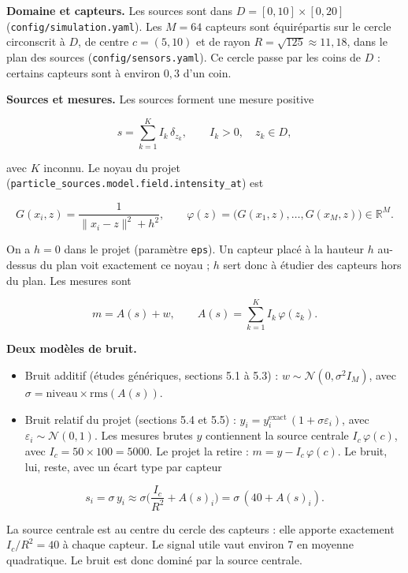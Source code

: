 \documentclass[
  french,
]{article}
\providecommand{\tightlist}{%
  \setlength{\itemsep}{0pt}\setlength{\parskip}{0pt}}
\begin{document}
\textbf{Domaine et capteurs.} Les sources sont dans
\(D = [0,10]\times[0,20]\) (\texttt{config/simulation.yaml}). Les
\(M = 64\) capteurs sont équirépartis sur le cercle circonscrit à \(D\),
de centre \(c = (5,10)\) et de rayon \(R = \sqrt{125}\approx 11{,}18\),
dans le plan des sources (\texttt{config/sensors.yaml}). Ce cercle passe
par les coins de \(D\) : certains capteurs sont à environ \(0{,}3\) d'un
coin.

\textbf{Sources et mesures.} Les sources forment une mesure positive

\[
s = \sum_{k=1}^{K} I_k\,\delta_{z_k}, \qquad I_k > 0,\quad z_k \in D,
\]

avec \(K\) inconnu. Le noyau du projet
(\texttt{particle\_sources.model.field.intensity\_at}) est

\[
G(x_i, z) = \frac{1}{\lVert x_i - z\rVert^2 + h^2},
\qquad
\varphi(z) = \big(G(x_1,z),\dots,G(x_M,z)\big) \in \mathbb{R}^M .
\]

On a \(h = 0\) dans le projet (paramètre \texttt{eps}). Un capteur placé
à la hauteur \(h\) au-dessus du plan voit exactement ce noyau ; \(h\)
sert donc à étudier des capteurs hors du plan. Les mesures sont

\[
m = A(s) + w, \qquad A(s) = \sum_{k=1}^{K} I_k\,\varphi(z_k).
\]

\textbf{Deux modèles de bruit.}

\begin{itemize}
\tightlist
\item
  Bruit additif (études génériques, sections 5.1 à 5.3) :
  \(w \sim \mathcal{N}(0,\sigma^2 I_M)\), avec
  \(\sigma = \text{niveau}\times\mathrm{rms}(A(s))\).
\item
  Bruit relatif du projet (sections 5.4 et 5.5) :
  \(y_i = y_i^{\mathrm{exact}}\,(1+\sigma\varepsilon_i)\), avec
  \(\varepsilon_i\sim\mathcal{N}(0,1)\). Les mesures brutes \(y\)
  contiennent la source centrale \(I_c\,\varphi(c)\), avec
  \(I_c = 50\times 100 = 5000\). Le projet la retire :
  \(m = y - I_c\,\varphi(c)\). Le bruit, lui, reste, avec un écart type
  par capteur
\end{itemize}

\[
s_i = \sigma\, y_i \approx \sigma\Big(\frac{I_c}{R^2} + A(s)_i\Big) = \sigma\,(40 + A(s)_i).
\]

La source centrale est au centre du cercle des capteurs : elle apporte
exactement \(I_c/R^2 = 40\) à chaque capteur. Le signal utile vaut
environ 7 en moyenne quadratique. Le bruit est donc dominé par la source
centrale.
\end{document}
